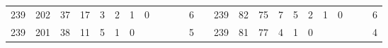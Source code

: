 {\begin{tabular}{cccccccccccclccccccccccc}
239                                                & 202                                                & 37                                               & 17                                               & 3                                                & 2                                                & 1                                               & 0                                               &                                                 &                                                 &                                                 & 6                                                &                          & 239                                                & 82                                                 & 75                                               & 7                                                & 5                                               & 2                                               & 1                                               & 0                                               &                                                 &                                                 & 6                                                \\
239                                                & 201                                                & 38                                               & 11                                               & 5                                                & 1                                                & 0                                               &                                                 &                                                 &                                                 &                                                 & 5                                                &                          & 239                                                & 81                                                 & 77                                               & 4                                                & 1                                               & 0                                               &                                                 &                                                 &                                                 &                                                 & 4                                                \\

\end{tabular}}
